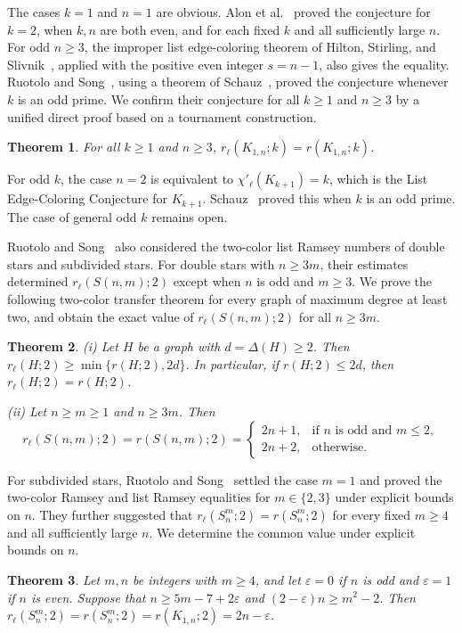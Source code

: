\documentclass[11pt]{article}
\newtheorem{theorem}{Theorem}[section]
\theoremstyle{definition}
\theoremstyle{remark}
\begin{document}
The cases \(k=1\) and \(n=1\) are obvious. Alon et al.~\cite{AlonEtAl} proved
the conjecture for \(k=2\), when \(k,n\) are both even, and for
each fixed \(k\) and all sufficiently large \(n\). For odd
\(n\ge3\), the improper list edge-coloring theorem of Hilton,
Stirling, and Slivnik~\cite{HiltonStirlingSlivnik}, applied with
the positive even integer \(s=n-1\), also gives the equality. Ruotolo and Song~\cite{RuotoloSong}, using a theorem of
Schauz~\cite{Schauz}, proved the conjecture whenever \(k\) is an
odd prime. We confirm their conjecture for all \(k\ge1\) and \(n\ge3\) by a unified direct proof based on a tournament construction.
\begin{theorem}
\label{thm:list-star}
For all \(k\ge1\) and \(n\ge3\),
\(r_{\ell}(K_{1,n};k)=r(K_{1,n};k)\).
\end{theorem}

For odd \(k\), the case \(n=2\) is equivalent to
\(\chi'_{\ell}(K_{k+1})=k\), which is the List Edge-Coloring Conjecture for $K_{k+1}$. Schauz~\cite{Schauz} proved this when
\(k\) is an odd prime.
The case of general odd \(k\) remains open.


Ruotolo and Song~\cite{RuotoloSong} also considered the two-color
list Ramsey numbers of double stars and subdivided stars. For double stars with
\(n\ge3m\), their estimates determined \(r_\ell(S(n,m);2)\)
except when \(n\) is odd and \(m\ge3\). We prove the following two-color transfer theorem for every graph
of maximum degree at least two, and obtain the exact value of
\(r_\ell(S(n,m);2)\) for all \(n\ge3m\).
\begin{theorem}
\label{thm:two-color-transfer}
\textup{(i)} Let \(H\) be a graph with \(d=\Delta(H)\geq2\). Then $r_{\ell}(H;2)\geq\min\{r(H;2),2d\}$.
In particular, if \(r(H;2)\leq2d\), then
\(r_{\ell}(H;2)=r(H;2)\).

\noindent
\textup{(ii)} Let \(n\geq m\geq1\) and \(n\geq3m\). Then
\[
 r_{\ell}(S(n,m);2)=r(S(n,m);2)
 =
 \begin{cases}
  2n+1,&\text{if \(n\) is odd and \(m\leq2\)},\\
  2n+2,&\text{otherwise}.
 \end{cases}
\]
\end{theorem}

For subdivided stars, Ruotolo and Song~\cite{RuotoloSong} settled the case
\(m=1\) and proved the two-color Ramsey and list Ramsey equalities
for \(m\in\{2,3\}\) under explicit bounds on \(n\). They further suggested that
\(r_\ell(S_n^m;2)=r(S_n^m;2)\) for every fixed \(m\ge4\)
and all sufficiently large \(n\).
We determine the common value
under explicit bounds on \(n\).
\begin{theorem}
\label{thm:two-color-subdivided}
Let \(m,n\) be integers with \(m\geq4\), and let
\(\varepsilon=0\) if \(n\) is odd and \(\varepsilon=1\) if \(n\)
is even. Suppose that $n\geq5m-7+2\varepsilon$ and $(2-\varepsilon)n\geq m^2-2$. Then $r_{\ell}(S_n^m;2)
 =r(S_n^m;2)
 =r(K_{1,n};2)
 =2n-\varepsilon$.
\end{theorem}
\end{document}
